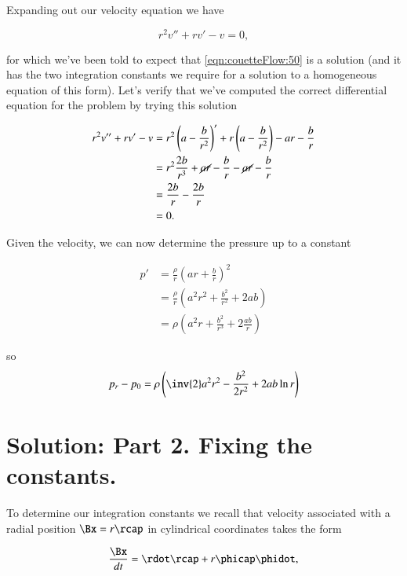 Expanding out our velocity equation we have

\begin{equation}\label{eqn:couetteFlow:170}
r^2 v'' + r v' - v = 0,
\end{equation}

for which we've been told to expect that \ref{eqn:couetteFlow:50} is a solution (and it has the two integration constants we require for a solution to a homogeneous equation of this form).  Let's verify that we've computed the correct differential equation for the problem by trying this solution

\begin{align*}
r^2 v'' + r v' - v 
&=
r^2 \left( a -\frac{b}{r^2} \right)' + r \left( a -\frac{b}{r^2} \right) - a r - \frac{b}{r} \\
&=
r^2 \frac{2 b}{r^3} + \cancel{a r} - \frac{b}{r} - \cancel{a r} - \frac{b}{r} \\
&=
\frac{2 b}{r} - \frac{2 b}{r} \\
&= 0.
\end{align*}

Given the velocity, we can now determine the pressure up to a constant

\begin{align*}
p' 
&= \frac{\rho}{r} \left( a r + \frac{b}{r} \right)^2 \\
&= \frac{\rho}{r} \left( a^2 r^2 + \frac{b^2}{r^2} + 2 a b \right) \\
&= \rho \left( a^2 r + \frac{b^2}{r^3} + 2 \frac{a b}{r} \right)
\end{align*}

so
\begin{equation}\label{eqn:couetteFlow:190}
p_r -p_0
= \rho \left( \inv{2} a^2 r^2 - \frac{b^2}{2 r^2} + 2 a b \ln r \right)
\end{equation}

\section{Solution: Part 2.  Fixing the constants.}

To determine our integration constants we recall that velocity associated with a radial position $\Bx = r \rcap$ in cylindrical coordinates takes the form

\begin{equation}\label{eqn:couetteFlow:210}
\frac{\Bx}{dt} = \rdot \rcap + r \phicap \phidot,
\end{equation}

